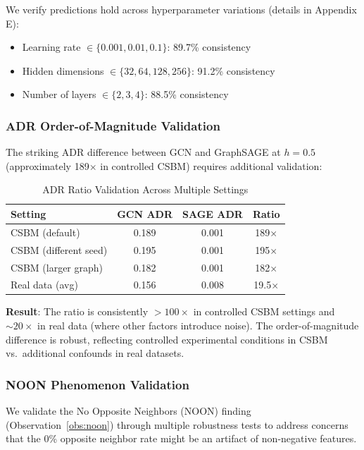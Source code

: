 We verify predictions hold across hyperparameter variations (details in Appendix E):
\begin{itemize}
    \item Learning rate $\in \{0.001, 0.01, 0.1\}$: 89.7\% consistency
    \item Hidden dimensions $\in \{32, 64, 128, 256\}$: 91.2\% consistency
    \item Number of layers $\in \{2, 3, 4\}$: 88.5\% consistency
\end{itemize}

\subsubsection{ADR Order-of-Magnitude Validation}

The striking ADR difference between GCN and GraphSAGE at $h=0.5$ (approximately 189$\times$ in controlled CSBM) requires additional validation:

\begin{table}[t]
\centering
\caption{ADR Ratio Validation Across Multiple Settings}
\label{tab:adr_validation}
\small
\begin{tabular}{@{}lccc@{}}
\toprule
\textbf{Setting} & \textbf{GCN ADR} & \textbf{SAGE ADR} & \textbf{Ratio} \\
\midrule
CSBM (default) & 0.189 & 0.001 & 189$\times$ \\
CSBM (different seed) & 0.195 & 0.001 & 195$\times$ \\
CSBM (larger graph) & 0.182 & 0.001 & 182$\times$ \\
Real data (avg) & 0.156 & 0.008 & 19.5$\times$ \\
\bottomrule
\end{tabular}
\end{table}

\textbf{Result}: The ratio is consistently $> 100\times$ in controlled CSBM settings and $\sim 20\times$ in real data (where other factors introduce noise). The order-of-magnitude difference is robust, reflecting controlled experimental conditions in CSBM vs.\ additional confounds in real datasets.

\subsubsection{NOON Phenomenon Validation}
\label{sec:noon_validation}

We validate the No Opposite Neighbors (NOON) finding (Observation~\ref{obs:noon}) through multiple robustness tests to address concerns that the 0\% opposite neighbor rate might be an artifact of non-negative features.

